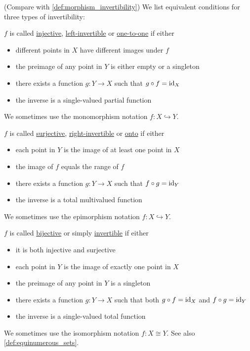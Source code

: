 \begin{definition}\label{def:function_invertibility}(Compare with \cref{def:morphism_invertibility})
  We list equivalent conditions for three types of invertibility:
  \begin{defenum}
    \item\label{def:function_invertibility/injection} $f$ is called \ul{injective}, \ul{left-invertible} or \ul{one-to-one} if either
    \begin{itemize}
      \item different points in $X$ have different images under $f$
      \item the preimage of any point in $Y$ is either empty or a singleton
      \item there exists a function $g: Y \to X$ such that $g \circ f = \operatorname{id}_X$
      \item the inverse is a single-valued partial function
    \end{itemize}

    We sometimes use the monomorphism notation $f: X \hookrightarrow Y$.

    \item\label{def:function_invertibility/surjection} $f$ is called \ul{surjective}, \ul{right-invertible} or \ul{onto} if either
    \begin{itemize}
      \item each point in $Y$ is the image of at least one point in $X$
      \item the image of $f$ equals the range of $f$
      \item there exists a function $g: Y \to X$ such that $f \circ g = \operatorname{id}_Y$
      \item the inverse is a total multivalued function
    \end{itemize}

    We sometimes use the epimorphism notation $f: X \hookrightarrow Y$.

    \item\label{def:function_invertibility/bijection} $f$ is called \ul{bijective} or simply \ul{invertible} if either
    \begin{itemize}
      \item it is both injective and surjective
      \item each point in $Y$ is the image of exactly one point in $X$
      \item the preimage of any point in $Y$ is a singleton
      \item there exists a function $g: Y \to X$ such that both $g \circ f = \operatorname{id}_X$ and $f \circ g = \operatorname{id}_Y$
      \item the inverse is a single-valued total function
    \end{itemize}

    We sometimes use the isomorphism notation $f: X \cong Y$. See also \cref{def:equinumerous_sets}.
  \end{defenum}
\end{definition}


